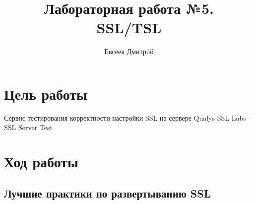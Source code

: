 \documentclass[10pt,a4paper]{report}
\author{Евсеев Дмитрий}
\title{Лабораторная работа №5.\\
	SSL/TSL}
\begin{document}
\maketitle
\tableofcontents
\pagebreak

\section{Цель работы}

Сервис тестирования корректности настройки SSL на сервере Qualys SSL Labs – SSL Server Test

\section{Ход работы}

\subsection{Лучшие практики по развертыванию SSL}
\end{document}
